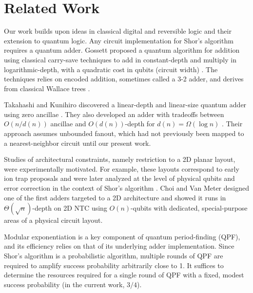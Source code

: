 \documentclass[twoside]{article}
\begin{document}

%
\section{Related Work}
\label{sec:related}

Our work builds upon ideas in classical digital and reversible logic and their extension to quantum logic.
Any circuit implementation for Shor's algorithm requires a quantum adder.
Gossett proposed a quantum algorithm for addition using classical carry-save techniques to add
in constant-depth and multiply in logarithmic-depth, with a quadratic
cost in qubits (circuit width) \cite{Gossett1998}. The techniques relies on encoded addition, sometimes
called a 3-2 adder, and derives from classical Wallace trees \cite{Wallace1964}.

Takahashi and Kunihiro discovered a linear-depth
and linear-size quantum adder using zero ancillae \cite{Takahashi2005}.
They also developed an adder with tradeoffs between $O(n/d(n))$ ancillae and
$O(d(n))$-depth for $d(n) = \Omega(\log n)$ \cite{Takahashi2009}. 
Their approach assumes unbounded fanout, which had not previously been mapped to a
nearest-neighbor circuit until our present work.

Studies of architectural constraints, namely restriction to a 2D planar layout, 
were experimentally motivated. For example, these layouts correspond
to early ion trap proposals \cite{Kielpinski2002}
and were later analyzed at the level of physical qubits and error correction in the context of Shor's algorithm \cite{Kubi09}.
Choi and Van Meter designed one of the first adders targeted to a 2D architecture 
and showed it runs in $\Theta(\sqrt{n})$-depth on \textsc{2D NTC} \cite{Choi2010}
using $O(n)$-qubits with dedicated, special-purpose areas of a physical
circuit layout.

Modular exponentiation is a key component of quantum period-finding (QPF),
and its efficiency relies on that of its underlying adder implementation.
Since Shor's algorithm is a probabilistic algorithm, multiple rounds of
QPF are required to amplify success probability arbitrarily close to 1.
It suffices to determine the resources
required for a single round of QPF with a fixed, modest success probability
(in the current work, $3/4$).
\end{document}
